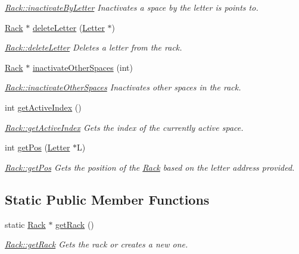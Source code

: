\begin{DoxyCompactItemize}
\begin{DoxyCompactList}\small\item\em \hyperlink{class_rack_afdf845eb458b07ed6029d29672ab120f}{Rack\-::inactivate\-By\-Letter} Inactivates a space by the letter is points to. \end{DoxyCompactList}\item 
\hyperlink{class_rack}{Rack} $\ast$ \hyperlink{class_rack_a93f23b989fbb09c0acfb42b24d071887}{delete\-Letter} (\hyperlink{class_letter}{Letter} $\ast$)
\begin{DoxyCompactList}\small\item\em \hyperlink{class_rack_a93f23b989fbb09c0acfb42b24d071887}{Rack\-::delete\-Letter} Deletes a letter from the rack. \end{DoxyCompactList}\item 
\hyperlink{class_rack}{Rack} $\ast$ \hyperlink{class_rack_a66591f08659676ac81eeec7f49f7e1ef}{inactivate\-Other\-Spaces} (int)
\begin{DoxyCompactList}\small\item\em \hyperlink{class_rack_a66591f08659676ac81eeec7f49f7e1ef}{Rack\-::inactivate\-Other\-Spaces} Inactivates other spaces in the rack. \end{DoxyCompactList}\item 
int \hyperlink{class_rack_adcaff679bc9261d773505a0bb132ab96}{get\-Active\-Index} ()
\begin{DoxyCompactList}\small\item\em \hyperlink{class_rack_adcaff679bc9261d773505a0bb132ab96}{Rack\-::get\-Active\-Index} Gets the index of the currently active space. \end{DoxyCompactList}\item 
int \hyperlink{class_rack_aa350328de6aa50d65c63556b930de13b}{get\-Pos} (\hyperlink{class_letter}{Letter} $\ast$L)
\begin{DoxyCompactList}\small\item\em \hyperlink{class_rack_aa350328de6aa50d65c63556b930de13b}{Rack\-::get\-Pos} Gets the position of the \hyperlink{class_rack}{Rack} based on the letter address provided. \end{DoxyCompactList}\end{DoxyCompactItemize}
\subsection*{Static Public Member Functions}
\begin{DoxyCompactItemize}
\item 
static \hyperlink{class_rack}{Rack} $\ast$ \hyperlink{class_rack_aa48de650c15bda8267451d84caf6ea3f}{get\-Rack} ()
\begin{DoxyCompactList}\small\item\em \hyperlink{class_rack_aa48de650c15bda8267451d84caf6ea3f}{Rack\-::get\-Rack} Gets the rack or creates a new one. \end{DoxyCompactList}\end{DoxyCompactItemize}
